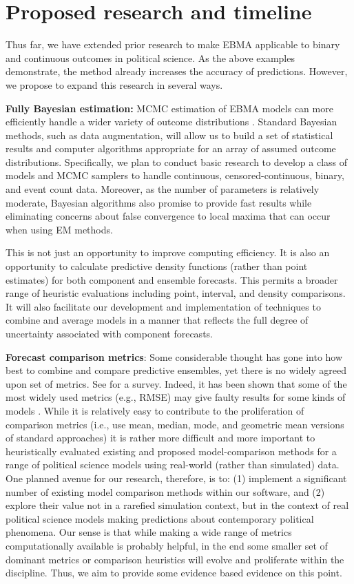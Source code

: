 \documentclass[pdftex,12pt,fullpage,oneside]{amsart}
\begin{document}
\section{Proposed research and timeline}

Thus far, we have extended prior research to make EBMA applicable to
binary and continuous outcomes in political science.  As the above
examples demonstrate, the method already increases the accuracy of
predictions.  However, we propose to expand this research in several
ways.

\textbf{Fully Bayesian estimation:} MCMC estimation of EBMA models can
more efficiently handle a wider variety of outcome distributions
\citep{Vrugt:2008}.  Standard Bayesian methods, such as data
augmentation, will allow us to build a set of statistical results and
computer algorithms appropriate for an array of assumed outcome
distributions.  Specifically, we plan to conduct basic research to
develop a class of models and MCMC samplers to handle continuous,
censored-continuous, binary, and event count data. Moreover, as the
number of parameters is relatively moderate, Bayesian algorithms also
promise to provide fast results while eliminating concerns about false
convergence to local maxima that can occur when using EM methods.
  
This is not just an opportunity to improve computing efficiency.  It
is also an opportunity to calculate predictive density functions
(rather than point estimates) for both component and ensemble
forecasts. This permits a broader range of heuristic evaluations
including point, interval, and density comparisons.  It will also
facilitate our development and implementation of techniques to combine
and average models in a manner that reflects the full degree of
uncertainty associated with component forecasts.
  
\textbf{Forecast comparison metrics}: Some considerable thought has
gone into how best to combine and compare predictive ensembles, yet
there is no widely agreed upon set of metrics. See
\citet{brandt:freeman:schrodt:2011} for a survey. Indeed, it has been
shown that some of the most widely used metrics (e.g., RMSE) may give
faulty results for some kinds of models
\citep{geweke:amisano:2011}. While it is relatively easy to contribute
to the proliferation of comparison metrics (i.e., use mean, median,
mode, and geometric mean versions of standard approaches) it is rather
more difficult and more important to heuristically evaluated existing
and proposed model-comparison methods for a range of political science
models using real-world (rather than simulated) data. One planned
avenue for our research, therefore, is to: (1) implement a significant
number of existing model comparison methods within our software, and
(2) explore their value not in a rarefied simulation context, but in
the context of real political science models making predictions about
contemporary political phenomena. Our sense is that while making a
wide range of metrics computationally available is probably helpful,
in the end some smaller set of dominant metrics or comparison
heuristics will evolve and proliferate within the discipline. Thus, we
aim to provide some evidence based evidence on this point.
\end{document}
